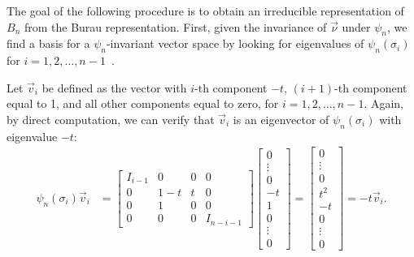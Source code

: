 The goal of the following procedure is to obtain an irreducible representation of $B_n$ from the Burau representation. First, given the invariance of $\vec{\nu}$ under $\psi_n$, we find a basis for a $\psi_n$-invariant vector space by looking for eigenvalues of $\psi_n(\sigma_i)$ for $i=1,2,\dots,n-1$~\cite{Delaney2016}.

Let $\vec{v}_i$ be defined as the vector with $i$-th component $-t$, $(i+1)$-th component equal to 1, and all other components equal to zero, for $i=1,2,\dots,n-1$. Again, by direct computation, we can verify that $\vec{v}_i$ is an eigenvector of $\psi_n(\sigma_i)$ with eigenvalue $-t$:
\begin{align*}
    \psi_n(\sigma_i)\vec{v}_i &= \begin{bmatrix}
        I_{i-1} & 0 & 0 & 0 \\
        0 & 1-t & t & 0 \\
        0 & 1 & 0 & 0 \\
        0 & 0 & 0 & I_{n-i-1}
    \end{bmatrix}\begin{bmatrix}
        0 \\ \vdots \\ 0 \\ -t \\ 1 \\ 0 \\ \vdots \\ 0
    \end{bmatrix} = \begin{bmatrix}
        0 \\ \vdots \\ 0 \\ t^2 \\ -t \\ 0 \\ \vdots \\ 0
    \end{bmatrix} = -t\vec{v}_i.
\end{align*}


